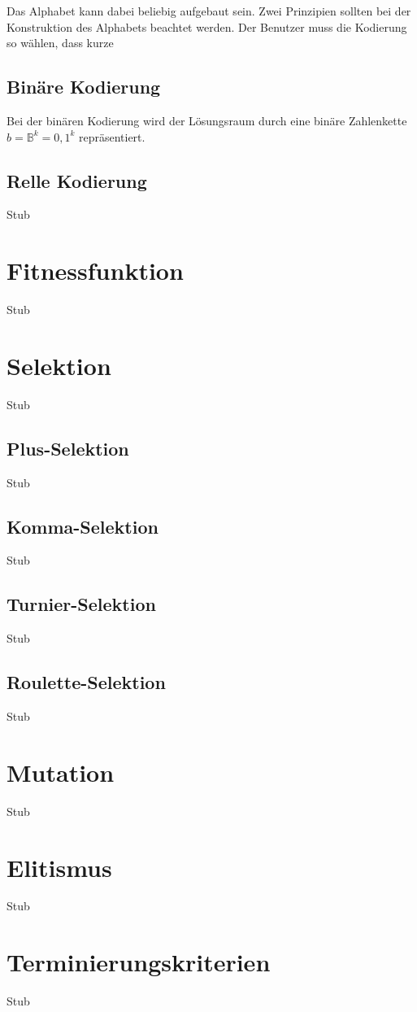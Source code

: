 Das Alphabet kann dabei beliebig aufgebaut sein. Zwei Prinzipien sollten bei der Konstruktion des Alphabets beachtet werden. 
Der Benutzer muss die Kodierung so wählen, dass kurze 

\subsection{Binäre Kodierung}
Bei der binären Kodierung wird der Lösungsraum durch eine binäre Zahlenkette $b = \mathbb{B}^k = {0, 1}^k$ repräsentiert. 

\subsection{Relle Kodierung}
Stub

\section{Fitnessfunktion}
Stub

\section{Selektion}
Stub

\subsection{Plus-Selektion}
Stub

\subsection{Komma-Selektion}
Stub

\subsection{Turnier-Selektion}
Stub

\subsection{Roulette-Selektion}
Stub

\section{Mutation}
Stub

\section{Elitismus}
Stub

\section{Terminierungskriterien}
Stub
